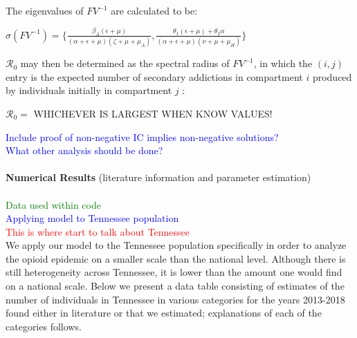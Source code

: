 \documentclass[12pt]{article}
\begin{document}
The eigenvalues of $FV^{-1}$ are calculated to be: 
\begin{center}
$\sigma (FV^{-1}) = \{ \frac{\beta_A(\epsilon+\mu)}{(\alpha+\epsilon+\mu)(\zeta+\mu+\mu_A)}, \frac{\theta_1(\epsilon+\mu)+\theta_2 \alpha}{(\alpha+\epsilon+\mu)(\nu+\mu+\mu_H)} \}$
\end{center}

$\mathscr{R}_0$ may then be determined as the spectral radius of $FV^{-1}$, in which the $(i,j)$ entry is the expected number of secondary addictions in compartment $i$ produced by individuals initially in compartment $j$ :
\begin{center}
$\mathscr{R}_0=$ WHICHEVER IS LARGEST WHEN KNOW VALUES! 
\end{center}

\textcolor{blue}{Include proof of non-negative IC implies non-negative solutions?} \\ 
\textcolor{blue}{What other analysis should be done?} \\ \\

\textbf{Numerical Results} 
(literature information and parameter estimation) \\ \\
 
 \textcolor{green}{Data used within code} \\
 \textcolor{blue}{Applying model to Tennessee population} \\
 \textcolor{red}{This is where start to talk about Tennessee} \\
We apply our model to the Tennessee population specifically in order to analyze the opioid epidemic on a smaller scale than the national level. Although there is still heterogeneity across Tennessee, it is lower than the amount one would find on a national scale. Below we present a data table consisting of estimates of the number of individuals in Tennessee in various categories for the years 2013-2018 found either in literature or that we estimated; explanations of each of the categories follows. 
\end{document}
